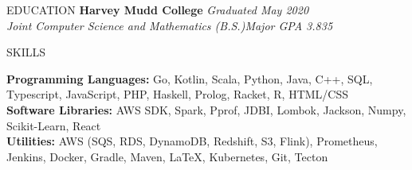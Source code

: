\documentclass{resume} %
\begin{document}
\begin{rSection}{EDUCATION}
{\bf Harvey Mudd College} \hfill {\em Graduated May 2020} \\
{\em Joint Computer Science and Mathematics (B.S.)}\hfill {\em Major GPA 3.835} \\
\end{rSection}
\begin{rSection}{SKILLS}

\textbf{Programming Languages:} Go, Kotlin, Scala, Python, Java, C++, SQL, Typescript, JavaScript, PHP, Haskell, Prolog, Racket, R, HTML/CSS  \\
\textbf{Software Libraries:} AWS SDK, Spark, Pprof, JDBI, Lombok, Jackson, Numpy, Scikit-Learn, React  \\
\textbf{Utilities:} AWS (SQS, RDS, DynamoDB, Redshift, S3, Flink), Prometheus, Jenkins, Docker, Gradle, Maven, \LaTeX, Kubernetes, Git, Tecton  
\end{rSection}
\end{document}
